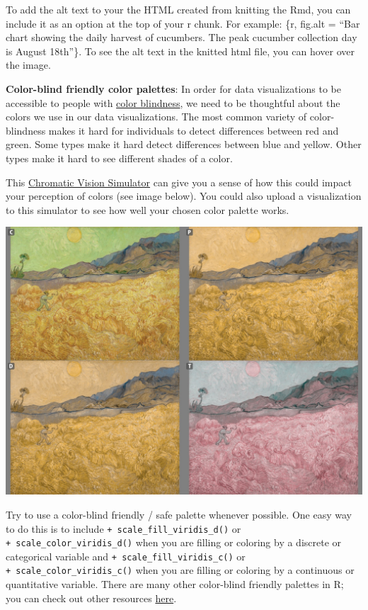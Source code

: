 \documentclass[
  letterpaper,
  DIV=11,
  numbers=noendperiod]{scrreprt}
\begin{document}
To add the alt text to your the HTML created from knitting the Rmd, you
can include it as an option at the top of your r chunk. For example:
\{r, fig.alt = ``Bar chart showing the daily harvest of cucumbers. The
peak cucumber collection day is August 18th''\}. To see the alt text in
the knitted html file, you can hover over the image.

\textbf{Color-blind friendly color palettes}: In order for data
visualizations to be accessible to people with
\href{https://www.nei.nih.gov/learn-about-eye-health/eye-conditions-and-diseases/color-blindness\#:~:text=What\%20is\%20color\%20blindness\%3F,and\%20contact\%20lenses\%20can\%20help.}{color
blindness}, we need to be thoughtful about the colors we use in our data
visualizations. The most common variety of color-blindness makes it hard
for individuals to detect differences between red and green. Some types
make it hard detect differences between blue and yellow. Other types
make it hard to see different shades of a color.

This \href{https://asada.website/webCVS/}{Chromatic Vision Simulator}
can give you a sense of how this could impact your perception of colors
(see image below). You could also upload a visualization to this
simulator to see how well your chosen color palette works.

\includegraphics[width=5.42in,height=\textheight]{src/../images/colorblind.jpg}

Try to use a color-blind friendly / safe palette whenever possible. One
easy way to do this is to include \texttt{+\ scale\_fill\_viridis\_d()}
or \texttt{+\ scale\_color\_viridis\_d()} when you are filling or
coloring by a discrete or categorical variable and
\texttt{+\ scale\_fill\_viridis\_c()} or
\texttt{+\ scale\_color\_viridis\_c()} when you are filling or coloring
by a continuous or quantitative variable. There are many other
color-blind friendly palettes in R; you can check out other resources
\href{https://cran.r-project.org/web/packages/colorBlindness/vignettes/colorBlindness.html}{here}.
\end{document}
